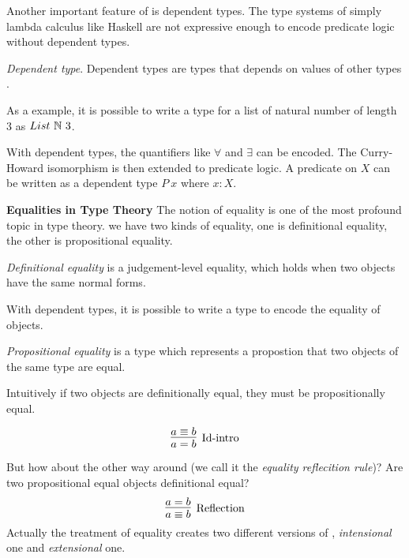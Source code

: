 Another important feature of \mltt is dependent types. The type systems of simply lambda calculus like Haskell are not expressive enough to encode predicate logic without dependent types.

\begin{definition}\label{dpty}
\textit{Dependent type}. Dependent types are types that depends on values of other types \cite{dtw}. 
\end{definition}

As a example, it is possible to write a type for a list of natural number of length 3 as $List~\mathbb{N} ~3$. 

With dependent types, the quantifiers like $\forall$ and $\exists$ can be encoded.
The Curry-Howard isomorphism is then extended to predicate logic. 
A predicate on $X$ can be written as a dependent type $P ~x$ where $x : X$. 


\textbf{Equalities in Type Theory}
The notion of equality is one of the most profound topic in type theory.
we have two kinds of equality, one is definitional equality, the other is propositional equality.

\begin{definition}
\textit{Definitional equality} is a judgement-level equality, which holds when two objects have the same normal forms\cite{nor:90}.
\end{definition}



With dependent types, it is possible to write a type to encode the equality of objects.

\begin{definition}
\textit{Propositional equality} is a type which represents a propostion that two objects of the same type are equal.
\end{definition}

Intuitively if two objects are definitionally equal, they must be propositionally equal.

\begin{equation*}
\infer[\text{Id-intro}]{a = b}{a \equiv b}
\end{equation*}

But how about the other way around (we call it the \emph{equality reflecition rule})? Are two propositional equal objects definitional equal?
\begin{equation}
\label{reflection}
\infer[\text{Reflection}]{a \equiv b}{a = b}
\end{equation}
 Actually
the treatment of equality creates two different versions of \mltt, \emph{intensional} one and \emph{extensional} one.

